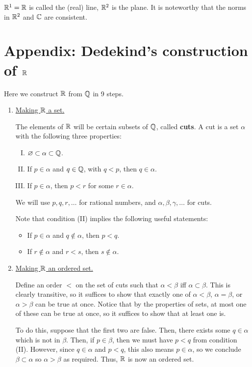 $\mathbb{R}^1 = \mathbb{R}$ is called the (real) line, $\mathbb{R}^2$ is the plane. It is noteworthy that the norms in $\mathbb{R}^2$ and $\mathbb{C}$ are consistent.

\section{Appendix: Dedekind's construction of $\mathbb{R}$}

Here we construct $\mathbb{R}$ from $\mathbb{Q}$ in 9 steps.

\begin{enumerate}[Step 1.]
\item \underline{Making $\mathbb{R}$ a set.} 

The elements of $\mathbb{R}$ will be certain subsets of $\mathbb{Q}$, called \textbf{cuts}. A cut is a set $\alpha$ with the following three properties:
\begin{enumerate}[(I)]
\item $\varnothing \subset \alpha \subset \mathbb{Q}$.
\item If $p \in \alpha$ and $q \in \mathbb{Q}$, with $q < p$, then $q \in \alpha$.
\item If $p \in \alpha$, then $p < r$ for some $r \in \alpha$.
\end{enumerate}

We will use $p, q, r, \dotsc$ for rational numbers, and $\alpha, \beta, \gamma, \dotsc$ for cuts. 

Note that condition (II) implies the following useful statements:
\begin{itemize}
\item If $p \in \alpha$ and $q \not\in \alpha$, then $p < q$.
\item If $r \not\in \alpha$ and $r < s$, then $s \not\in \alpha$.
\end{itemize}

\item \underline{Making $\mathbb{R}$ an ordered set.} 

Define an order $<$ on the set of cuts such that $\alpha < \beta$ iff $\alpha \subset \beta$. This is clearly transitive, so it suffices to show that exactly one of $\alpha < \beta$, $\alpha = \beta$, or $\alpha > \beta$ can be true at once. Notice that by the properties of sets, at most one of these can be true at once, so it suffices to show that at least one is.

To do this, suppose that the first two are false. Then, there exists some $q \in \alpha$ which is not in $\beta$. Then, if $p \in \beta$, then we must have $p < q$ from condition (II). However, since $q \in \alpha$ and $p < q$, this also means $p \in \alpha$, so we conclude $\beta \subset \alpha$ so $\alpha > \beta$ as required. Thus, $\mathbb{R}$ is now an ordered set.


\end{enumerate}
